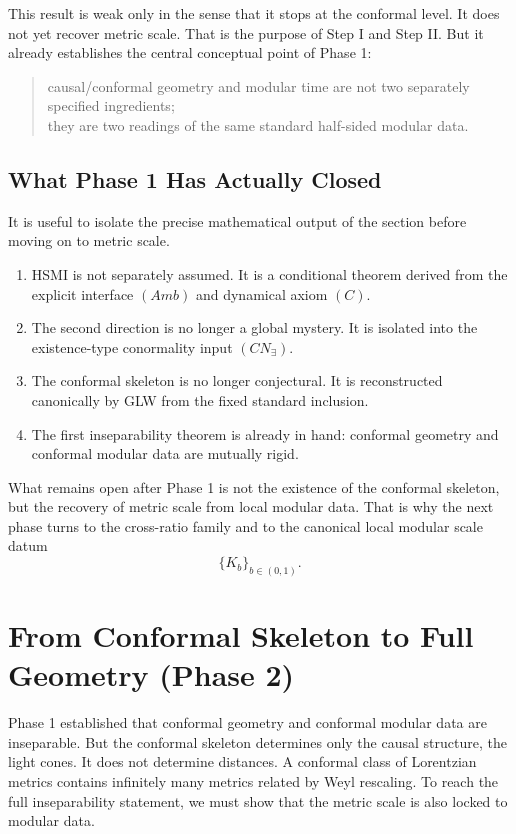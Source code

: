 \documentclass[12pt]{article}
\theoremstyle{definition}
\theoremstyle{remark}
\newcommand{\tightlist}{%
  \setlength{\itemsep}{0pt}\setlength{\parskip}{0pt}}
\begin{document}
This result is weak only in the sense that it stops at the conformal
level. It does not yet recover metric scale. That is the purpose of Step
I and Step II\@. But it already establishes the central conceptual point
of Phase 1:

\begin{quote}
causal/conformal geometry and modular time are not two separately
specified ingredients;\\
they are two readings of the same standard half-sided modular data.
\end{quote}

\subsection{What Phase 1 Has Actually
Closed}\label{what-phase-1-has-actually-closed}

It is useful to isolate the precise mathematical output of the section
before moving on to metric scale.

\begin{enumerate}
\def\labelenumi{\arabic{enumi}.}
\tightlist
\item
  HSMI is not separately assumed. It is a conditional theorem derived
  from the explicit interface \((Amb)\) and dynamical axiom \((C)\).
\item
  The second direction is no longer a global mystery. It is isolated
  into the existence-type conormality input \((CN_\exists)\).
\item
  The conformal skeleton is no longer conjectural. It is reconstructed
  canonically by GLW from the fixed standard inclusion.
\item
  The first inseparability theorem is already in hand: conformal
  geometry and conformal modular data are mutually rigid.
\end{enumerate}

What remains open after Phase 1 is not the existence of the conformal
skeleton, but the recovery of metric scale from local modular data. That
is why the next phase turns to the cross-ratio family and to the
canonical local modular scale datum \[
\{K_b\}_{b\in(0,1)}.
\]

\section{From Conformal Skeleton to Full Geometry (Phase
2)}\label{from-conformal-skeleton-to-full-geometry-phase-2}

Phase 1 established that conformal geometry and conformal modular data
are inseparable. But the conformal skeleton determines only the causal
structure, the light cones. It does not determine distances. A conformal
class of Lorentzian metrics contains infinitely many metrics related by
Weyl rescaling. To reach the full inseparability statement, we must show
that the metric scale is also locked to modular data.
\end{document}
